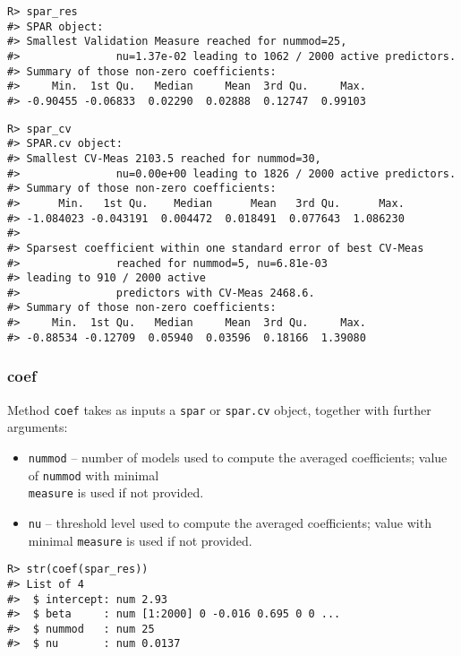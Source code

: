 \documentclass[
  article]{jss}
\begin{document}
\begin{verbatim}
R> spar_res
#> SPAR object:
#> Smallest Validation Measure reached for nummod=25,
#>               nu=1.37e-02 leading to 1062 / 2000 active predictors.
#> Summary of those non-zero coefficients:
#>     Min.  1st Qu.   Median     Mean  3rd Qu.     Max. 
#> -0.90455 -0.06833  0.02290  0.02888  0.12747  0.99103
\end{verbatim}

\begin{verbatim}
R> spar_cv
#> SPAR.cv object:
#> Smallest CV-Meas 2103.5 reached for nummod=30,
#>               nu=0.00e+00 leading to 1826 / 2000 active predictors.
#> Summary of those non-zero coefficients:
#>      Min.   1st Qu.    Median      Mean   3rd Qu.      Max. 
#> -1.084023 -0.043191  0.004472  0.018491  0.077643  1.086230 
#> 
#> Sparsest coefficient within one standard error of best CV-Meas
#>               reached for nummod=5, nu=6.81e-03 
#> leading to 910 / 2000 active
#>               predictors with CV-Meas 2468.6.
#> Summary of those non-zero coefficients:
#>     Min.  1st Qu.   Median     Mean  3rd Qu.     Max. 
#> -0.88534 -0.12709  0.05940  0.03596  0.18166  1.39080
\end{verbatim}

\subsubsection{coef}\label{coef}

Method \texttt{coef} takes as inputs a \texttt{spar} or \texttt{spar.cv}
object, together with further arguments:

\begin{itemize}
\item
  \texttt{nummod} -- number of models used to compute the averaged
  coefficients; value of \texttt{nummod} with minimal\\
  \texttt{measure} is used if not provided.
\item
  \texttt{nu} -- threshold level used to compute the averaged
  coefficients; value with minimal \texttt{measure} is used if not
  provided.
\end{itemize}

\begin{verbatim}
R> str(coef(spar_res))
#> List of 4
#>  $ intercept: num 2.93
#>  $ beta     : num [1:2000] 0 -0.016 0.695 0 0 ...
#>  $ nummod   : num 25
#>  $ nu       : num 0.0137
\end{verbatim}
\end{document}
